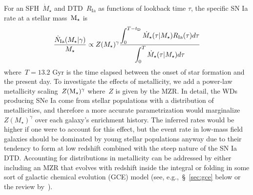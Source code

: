 \documentclass[foo.tex]{subfiles}
\begin{document}
For an SFH~$\dot{M}_\star$ and DTD~$R_\text{Ia}$ as functions of lookback time
$\tau$, the specific SN Ia rate at a stellar mass~$\text{M}_\star$ is
\begin{equation}
\frac{\dot{N}_\text{Ia}(M_\star | \gamma)}{M_\star} \propto Z(M_\star)^\gamma
\frac{\displaystyle{
	\int_0^{T - t_\text{D}}\dot{M}_\star(\tau | M_\star) R_\text{Ia}(\tau) d\tau
}}{\displaystyle{
	\int_0^T \dot{M}_\star(\tau | M_\star) d\tau
}}
\label{eq:specia}
\end{equation}
where~$T = 13.2$ Gyr is the time elapsed between the onset of star formation
and the present day.
To investigate the effects of metallicity, we add a power-law metallicity
scaling~$Z(\text{M}_\star)^\gamma$ where~$Z$ is given by the MZR.
{\color{red}
In detail, the WDs producing SNe Ia come from stellar populations with a
distribution of metallicities, and therefore a more accurate parametrization
would marginalize~$Z(M_\star)^\gamma$ over each galaxy's enrichment history.
The inferred rates would be higher if one were to account for this effect, but
the event rate in low-mass field galaxies should be dominated by young stellar
populations anyway due to their tendency to form at low redshift combined with
the steep nature of the SN Ia DTD.
Accounting for distributions in metallicity can be addressed by either
including an MZR that evolves with redshift inside the integral or folding in
some sort of galactic chemical evolution (GCE) model (see,
e.g.,~\S~\ref{sec:gce} below or the review by~\citealp{Matteucci2021}).
}
\end{document}
